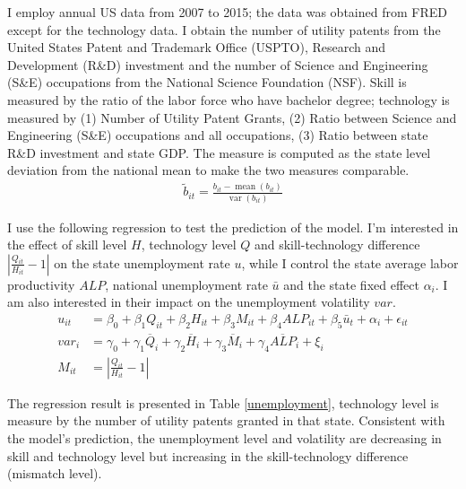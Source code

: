 \documentclass[12pt]{article}
\newcommand{\1}{\mathbb{1}}
\DeclareMathOperator{\mean}{mean}
\DeclareMathOperator{\var}{var}
\begin{document}
I employ annual US data from 2007 to 2015; the data was obtained from FRED except for the technology data. I obtain the number of utility patents from the United States Patent and Trademark Office (USPTO), Research and Development (R\&D) investment and the number of Science and Engineering (S\&E) occupations from the National Science Foundation (NSF). Skill is measured by the ratio of the labor force who have bachelor degree; technology is measured by (1) Number of Utility Patent Grants, (2) Ratio between Science and Engineering (S\&E) occupations and all occupations, (3) Ratio between state R\&D investment and state GDP. The measure is computed as the state level deviation from the national mean to make the two measures comparable.
\begin{align*}
\tilde{b}_{it} = \frac{b_{it}-\mean(b_{it})}{\var(b_{it})}
\end{align*}

I use the following regression to test the prediction of the model. I'm interested in the effect of skill level $H$, technology level $Q$ and skill-technology difference $|\frac{Q_{it}}{H_{it}}-1|$ on the state unemployment rate $u$, while I control the state average labor productivity $ALP$, national unemployment rate $\bar{u}$ and the state fixed effect $\alpha_i$. I am also interested in their impact on the unemployment volatility $var$. 
\begin{align*}
u_{it} &= \beta_0+\beta_1Q_{it} +\beta_2 H_{it}+ \beta_3M_{it} +\beta_4 ALP_{it} +\beta_5\bar{u}_t+\alpha_i+\epsilon_{it} \\
var_{i} &= \gamma_0+\gamma_1\overline{Q}_{i} +\gamma_2 \overline{H}_{i}+ \gamma_3\overline{M}_{i} +\gamma_4 \overline{ALP}_{i} +\xi_{i}  \\
M_{it} &= |\frac{Q_{it}}{H_{it}}-1| 
\end{align*}

The regression result is presented in Table \ref{unemployment}, technology level is measure by the number of utility patents granted in that state. Consistent with the model's prediction, the unemployment level and volatility are decreasing in skill and technology level but increasing in the skill-technology difference (mismatch level).
\end{document}
